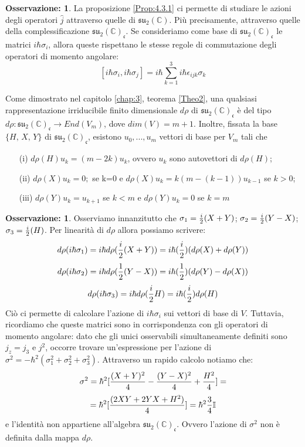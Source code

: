 \documentclass[12pt,a4paper]{report}
\theoremstyle{definition}
\theoremstyle{Theorem}
\theoremstyle{definition}
\theoremstyle{definition}
\theoremstyle{definition}
\newtheorem{Obs}[Def]{Osservazione:}
\begin{document}
\begin{Obs}
	La proposizione \ref{Prop:4.3.1} ci permette di studiare le azioni degli operatori $\hat{j}$ attraverso quelle di $\mathfrak{su_2(\mathbb{C})}$. Più precisamente, attraverso quelle della complessificazione $\mathfrak{su_2(\mathbb{C})_c}$. Se consideriamo come base di $\mathfrak{su_2(\mathbb{C})_c}$ le matrici $i\hbar\sigma_i$, allora queste rispettano le stesse regole di commutazione degli operatori di momento angolare:
	$$[i\hbar\sigma_i,i\hbar\sigma_j]=i\hbar\sum_{k=1}^{3}i\hbar\epsilon_{ijk}\sigma_k$$ 
\end{Obs}
Come dimostrato nel capitolo \ref{chap:3}, teorema \ref{Theo2}, una qualsiasi rappresentazione irriducibile finito dimensionale $d\rho$ di $\mathfrak{su_2(\mathbb{C})_c}$ è del tipo $d\rho: \mathfrak{su_2(\mathbb{C})_c}\rightarrow End(V_m)$, dove $dim(V)=m+1$. Inoltre, fissata la base $\{H,\, X,\, Y\}$ di $\mathfrak{su_2(\mathbb{C})_c}$, esistono $u_0,...,u_m$ vettori di base per $V_m$ tali che
\begin{itemize}
	\item[(i)] $d\rho(H)u_k=(m-2k)u_k$, ovvero $u_k$ sono autovettori di $d\rho(H)$;
	\item[(ii)] $d\rho(X)u_k=0;$ se k=0 e $d\rho(X)u_k=k(m-(k-1))u_{k-1}$ se $k>0$;
	\item[(iii)] $d\rho(Y)u_k=u_{k+1}$ se $k<m$ e $d\rho(Y)u_k=0$ se $k=m$
\end{itemize}
\begin{Obs}
	Osserviamo innanzitutto che $\sigma_1={i\over 2}(X+Y)$; $\sigma_2={i\over 2}(Y-X)$; $\sigma_3={i\over 2}(H)$. Per linearità di $d\rho$ allora possiamo scrivere: $$d\rho(i\hbar\sigma_1)=i\hbar d\rho({i\over 2}(X+Y))=i\hbar({i\over2})(d\rho(X)+d\rho(Y))$$
	$$d\rho(i\hbar\sigma_2)=i\hbar d\rho({1\over 2}(Y-X))=i\hbar({1\over2})(d\rho(Y)-d\rho(X))$$
	$$d\rho(i\hbar\sigma_3)=i\hbar d\rho({i\over 2}H)=i\hbar({i\over2})d\rho(H)$$
	Ciò ci permette di calcolare l'azione di $i\hbar\sigma_i$ sui vettori di base di $V$. Tuttavia, ricordiamo che queste matrici sono in corrispondenza con gli operatori di momento angolare: dato che gli unici osservabili simultaneamente definiti sono $j_z=j_3$ e $j^2$, occorre trovare un'espressione per l'azione di $\sigma^2=-\hbar^2(\sigma_1^2+\sigma_2^2+\sigma_3^2)$. Attraverso un rapido calcolo notiamo che:
	$$\sigma^2=\hbar^2[{(X+Y)^2\over 4}-{(Y-X)^2\over 4}+{H^2\over 4}]=$$
	$$=\hbar^2[{(2XY+2YX+H^2)\over 4}]=\hbar^2{3\over 4}\mathbb{I}$$
	e l'identità non appartiene all'algebra $\mathfrak{su_2(\mathbb{C})_c}$. Ovvero l'azione di $\sigma^2$ non è definita dalla mappa $d\rho$. 
\end{Obs}
\end{document}
